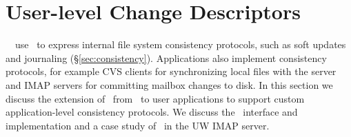 \section{User-level Change Descriptors}
\label{sec:opgroup}


\newcommand{\opgroupCreate}{\texttt{opgroup\_create()}}
\newcommand{\opgroupSync}{\texttt{opgroup\_sync()}}
\newcommand{\opgroupAddDepend}{\texttt{opgroup\_add\_depend()}}
\newcommand{\opgroupEngage}{\texttt{opgroup\_engage()}}
\newcommand{\opgroupDisengage}{\texttt{opgroup\_disengage()}}
\newcommand{\opgroupRelease}{\texttt{opgroup\_release()}}
\newcommand{\opgroupAbandon}{\texttt{opgroup\_abandon()}}

\begin{comment}
opgroup
changegroup
user-level change descriptor
chap (CHAnge grouP)
uchad (User-level CHAnge Descriptor)
sher (uSer-level cHange dEscriptor gRoup)
\end{comment}

\Kudos\ \modules\ use \chdescs\ to express internal file system
consistency protocols, such as soft updates and journaling
(\S\ref{sec:consistency}).
%
Applications also implement consistency protocols, for example CVS
clients for synchronizing local files with the server and IMAP servers
for committing mailbox changes to disk. In this section we discuss the
extension of \chdescs\ from \Kudos\ to user applications to support
custom application-level consistency protocols. We discuss the
\opgroup\ interface and implementation and a case study of \opgroups\
in the UW IMAP server.

\begin{comment}
Old:
Many file systems strive to maintain internal file system consistency
across system and hardware failures; \chdescs\ can express such write
ordering requirements. But file systems are by no means the sole
players to benefit from robustness to system and hardware failures.
User applications often manipulate persistent data in manners subject
to data corruption or loss. Applications often protect user data using
interfaces like Unix's \texttt{sync()} and \texttt{fsync()} system
calls in combination with write ordering. \Opgroups\ provide finer
grained and less restrictive write ordering control so that
applications can express \textit{minimal} ordering requirements to
implement custom consistency semantics and make custom performance
requirement tradeoffs. In this section we present the \opgroup\
interface and implementation and a case study of \opgroups\ in the
UW IMAP server.
\end{comment}

